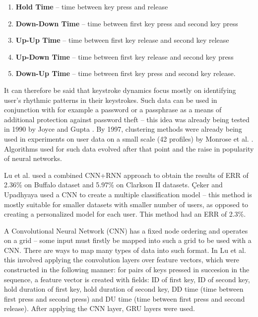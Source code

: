 \begin{enumerate}
    \item \textbf{Hold Time} -- time between key press and release
    \item \textbf{Down-Down Time} -- time between first key press and second key press
    \item \textbf{Up-Up Time} -- time between first key release and second key release
    \item \textbf{Up-Down Time} -- time between first key release and second key press
    \item \textbf{Down-Up Time} -- time between first key press and second key release.
\end{enumerate}

It can therefore be said that keystroke dynamics focus mostly on identifying user's rhythmic patterns in their keystrokes. Such data can be used in conjunction with for example a password or a passphrase as a means of additional protection against password theft -- this idea was already being tested in 1990 by Joyce and Gupta \cite{joyce1990keystroke}. By 1997, clustering methods were already being used in experiments on user data on a small scale (42 profiles) by Monrose et al. \cite{Monr1997}. Algorithms used for such data evolved after that point and the raise in popularity of neural networks.

Lu et al. \cite{Lu2020} used a combined CNN+RNN approach to obtain the results of ERR of 2.36\% on Buffalo dataset and 5.97\% on Clarkson II datasets. Çeker and Upadhyaya \cite{ceker_cnn2017} used a CNN to create a multiple classification model -- this method is mostly suitable for smaller datasets with smaller number of users, as opposed to creating a personalized model for each user. This method had an ERR of 2.3\%. 

A Convolutional Neural Network (CNN) has a fixed node ordering and operates on a grid -- some input must firstly be mapped into such a grid to be used with a CNN. There are ways to map many types of data into such format. In Lu et al. this involved applying the convolution layers over feature vectors, which were constructed in the following manner: for pairs of keys pressed in succesion in the sequence, a feature vector is created with fields: ID of first key, ID of second key, hold duration of first key, hold duration of second key, DD time (time between first press and second press) and DU time (time between first press and second release). After applying the CNN layer, GRU layers were used.


